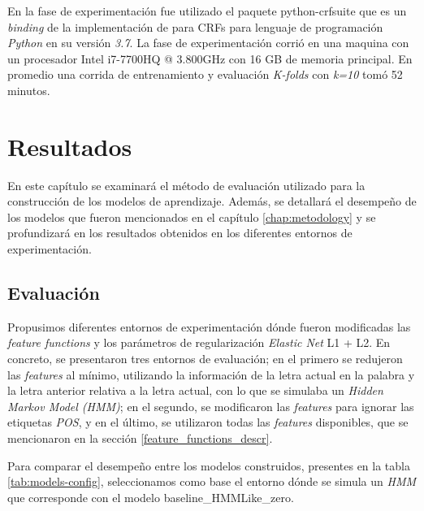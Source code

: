 \documentclass[letterpaper,12pt,oneside]{book}
\theoremstyle{definition}
\begin{document}
En la fase de experimentación fue utilizado el paquete \textsf{python-crfsuite} que es un \textit{binding} de la implementación de \citet{CRFsuite} para CRFs para lenguaje de programación \textit{Python} en su versión \textit{3.7}. La fase de experimentación corrió en una maquina con un procesador \textsf{Intel i7-7700HQ @ 3.800GHz} con \textsf{16 GB} de memoria principal. En promedio una corrida de entrenamiento y evaluación \textit{K-folds} con \textit{k=10} tomó 52 minutos.


\chapter{Resultados}

En este capítulo se examinará el método de evaluación utilizado para la construcción de los modelos de aprendizaje. Además, se detallará el desempeño de los modelos que fueron mencionados en el capítulo \ref{chap:metodology} y se profundizará en los resultados obtenidos en los diferentes entornos de experimentación. 


\section{Evaluación}

Propusimos diferentes entornos de experimentación dónde fueron modificadas las \textit{feature functions} y los parámetros de regularización \textit{Elastic Net} L1 + L2. En concreto, se presentaron tres entornos de evaluación; en el primero se redujeron las \textit{features} al mínimo, utilizando la información de la letra actual en la palabra y la letra anterior relativa a la letra actual, con lo que se simulaba un \textit{Hidden Markov Model (HMM)}; en el segundo, se modificaron las \textit{features} para ignorar las etiquetas \textit{POS}, y en el último, se utilizaron todas las \textit{features} disponibles, que se mencionaron en la sección \ref{feature_functions_descr}.

Para comparar el desempeño entre los modelos construidos, presentes en la tabla \ref{tab:models-config}, seleccionamos como base el entorno dónde se simula un \textit{HMM} que corresponde con el modelo \textsf{baseline\_HMMLike\_zero}.
\end{document}
